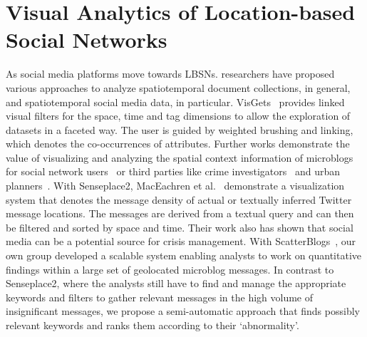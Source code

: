 \section{Visual Analytics of Location-based Social Networks}
As social media platforms move towards LBSNs.
researchers have proposed various approaches to analyze spatiotemporal document collections, in general, and spatiotemporal social media data, in particular.
VisGets~\cite{Doerk2008} provides linked visual filters for the space, time and tag dimensions to allow the exploration of datasets in a faceted way.
The user is guided by weighted brushing and linking, which denotes the co-occurrences of attributes.
Further works demonstrate the value of visualizing and analyzing the spatial context information of microblogs for social network users~\cite{Field:2010:CEI} or third parties like crime investigators~\cite{Roth:2010:TGA} and urban planners~\cite{Wakamiya:2011:CUC}.
With Senseplace2, MacEachren et al.~\cite{MacEachren:2011:SGA} demonstrate a visualization system that denotes the message density of actual or textually inferred Twitter message locations.
The messages are derived from a textual query and can then be filtered and sorted by space and time.
Their work also has shown that social media can be a potential source for crisis management.
With ScatterBlogs~\cite{Bosch:2011:SGD}, our own group developed a scalable system enabling analysts to work on quantitative findings within a large set of geolocated microblog messages.
In contrast to Senseplace2, where the analysts still have to find and manage the appropriate keywords and filters to gather relevant messages in the high volume of insignificant messages, we propose a semi-automatic approach that finds possibly relevant keywords and ranks them according to their \textquoteleft abnormality\textquoteright.

